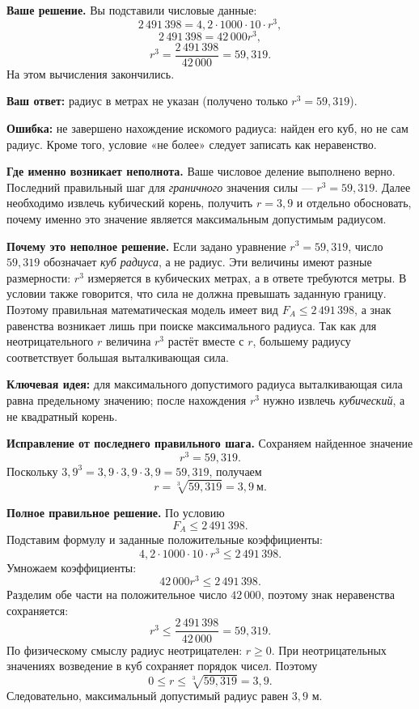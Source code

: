 \documentclass[12pt,a4paper]{article}
\newcommand{\ReviewField}[1]{{\color{ReviewTeal}\bfseries #1}\space}
\newcommand{\ReviewError}[1]{{\color{ReviewErrorInk}\bfseries #1}\space}
\begin{document}
\ReviewField{Ваше решение.} Вы подставили числовые данные:
\[
2\,491\,398=4{,}2\cdot1000\cdot10\cdot r^3,
\]
\[
2\,491\,398=42\,000r^3,
\]
\[
r^3=\frac{2\,491\,398}{42\,000}=59{,}319.
\]
На этом вычисления закончились.

\ReviewField{Ваш ответ:} радиус в метрах не указан (получено только $r^3=59{,}319$).

\ReviewError{Ошибка:} не завершено нахождение искомого радиуса: найден его куб, но не сам радиус. Кроме того, условие «не более» следует записать как неравенство.

\ReviewField{Где именно возникает неполнота.} Ваше числовое деление выполнено верно. Последний правильный шаг для \emph{граничного} значения силы --- $r^3=59{,}319$. Далее необходимо извлечь кубический корень, получить $r=3{,}9$ и отдельно обосновать, почему именно это значение является максимальным допустимым радиусом.

\ReviewField{Почему это неполное решение.} Если задано уравнение $r^3=59{,}319$, число $59{,}319$ обозначает \emph{куб радиуса}, а не радиус. Эти величины имеют разные размерности: $r^3$ измеряется в кубических метрах, а в ответе требуются метры. В условии также говорится, что сила не должна превышать заданную границу. Поэтому правильная математическая модель имеет вид $F_A\le2\,491\,398$, а знак равенства возникает лишь при поиске максимального радиуса. Так как для неотрицательного $r$ величина $r^3$ растёт вместе с $r$, большему радиусу соответствует большая выталкивающая сила.

\ReviewField{Ключевая идея:} для максимального допустимого радиуса выталкивающая сила равна предельному значению; после нахождения $r^3$ нужно извлечь \emph{кубический}, а не квадратный корень.

\ReviewField{Исправление от последнего правильного шага.} Сохраняем найденное значение
\[
r^3=59{,}319.
\]
Поскольку $3{,}9^3=3{,}9\cdot3{,}9\cdot3{,}9=59{,}319$, получаем
\[
\boxed{r=\sqrt[3]{59{,}319}=3{,}9\ \text{м}}.
\]

\ReviewField{Полное правильное решение.} По условию
\[
F_A\le2\,491\,398.
\]
Подставим формулу и заданные положительные коэффициенты:
\[
4{,}2\cdot1000\cdot10\cdot r^3\le2\,491\,398.
\]
Умножаем коэффициенты:
\[
42\,000r^3\le2\,491\,398.
\]
Разделим обе части на положительное число $42\,000$, поэтому знак неравенства сохраняется:
\[
r^3\le\frac{2\,491\,398}{42\,000}=59{,}319.
\]
По физическому смыслу радиус неотрицателен: $r\ge0$. При неотрицательных значениях возведение в куб сохраняет порядок чисел. Поэтому
\[
0\le r\le\sqrt[3]{59{,}319}=3{,}9.
\]
Следовательно, максимальный допустимый радиус равен $3{,}9$ м.
\end{document}
